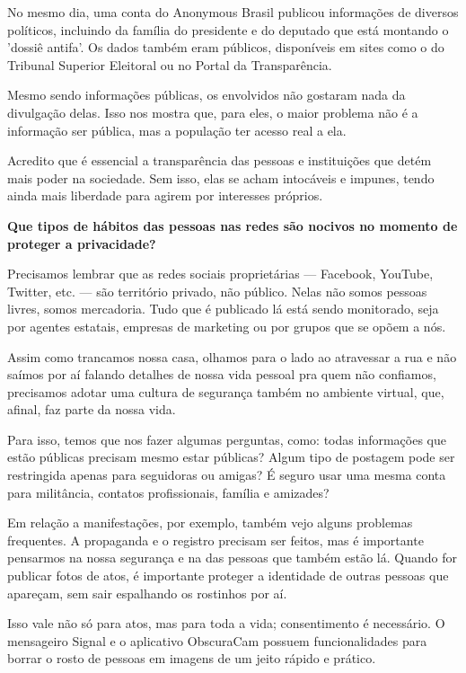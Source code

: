 No mesmo dia, uma conta do Anonymous Brasil publicou informações de
diversos políticos, incluindo da família do presidente e do deputado que
está montando o 'dossiê antifa'. Os dados também eram públicos,
disponíveis em sites como o do Tribunal Superior Eleitoral ou no Portal
da Transparência.

Mesmo sendo informações públicas, os envolvidos não gostaram nada da
divulgação delas. Isso nos mostra que, para eles, o maior problema não é
a informação ser pública, mas a população ter acesso real a ela.

Acredito que é essencial a transparência das pessoas e instituições que
detém mais poder na sociedade. Sem isso, elas se acham intocáveis e
impunes, tendo ainda mais liberdade para agirem por interesses próprios.

\bigskip

\noindent{}\textbf{Que tipos de hábitos das pessoas nas redes são nocivos no
momento de proteger a privacidade? }

Precisamos lembrar que as redes sociais
proprietárias --- Facebook, YouTube, Twitter, etc. --- são território
privado, não público. Nelas não somos pessoas livres, somos mercadoria.
Tudo que é publicado lá está sendo monitorado, seja por agentes
estatais, empresas de marketing ou por grupos que se opõem a nós.

Assim como trancamos nossa casa, olhamos para o lado ao atravessar a rua
e não saímos por aí falando detalhes de nossa vida pessoal pra quem não
confiamos, precisamos adotar uma cultura de segurança também no ambiente
virtual, que, afinal, faz parte da nossa vida.

Para isso, temos que nos fazer algumas perguntas, como: todas
informações que estão públicas precisam mesmo estar públicas? Algum tipo
de postagem pode ser restringida apenas para seguidoras ou amigas? É
seguro usar uma mesma conta para militância, contatos profissionais,
família e amizades?

Em relação a manifestações, por exemplo, também vejo alguns problemas
frequentes. A propaganda e o registro precisam ser feitos, mas é
importante pensarmos na nossa segurança e na das pessoas que também
estão lá. Quando for publicar fotos de atos, é importante proteger a
identidade de outras pessoas que apareçam, sem sair espalhando os
rostinhos por aí.

Isso vale não só para atos, mas para toda a vida; consentimento é
necessário. O mensageiro Signal e
o aplicativo
ObscuraCam possuem funcionalidades para borrar o rosto de pessoas em imagens de
um jeito rápido e prático.

